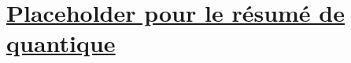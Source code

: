 \documentclass[11pt]{article}
\begin{document}





\section{\underline{Placeholder pour le résumé de quantique}}

\subsection{}
\end{document}
